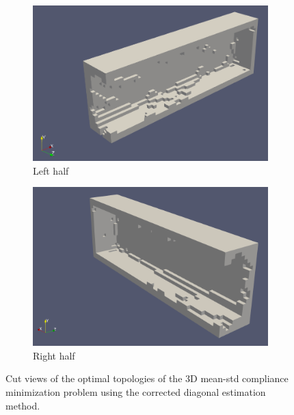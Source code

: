     \begin{figure}
      \begin{subfigure}[t]{0.45\textwidth}
        \centering
        \includegraphics[width=1\textwidth]{./images/robust_approx/diagonal_mean_std_1.png}
        \caption{Left half}
      \end{subfigure} \hfill
      \begin{subfigure}[t]{0.45\textwidth}
        \centering
        \includegraphics[width=1\textwidth]{./images/robust_approx/diagonal_mean_std_2.png}
        \caption{Right half}
      \end{subfigure}
      \caption{Cut views of the optimal topologies of the 3D mean-std compliance minimization problem using the corrected diagonal estimation method.}
      \label{fig:diagonal_mean_std_3d}
    \end{figure}

